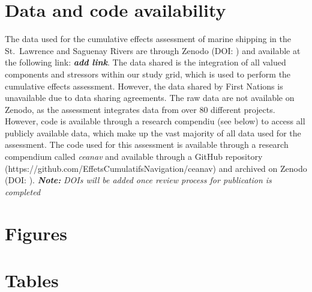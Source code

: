 \documentclass[preprint, 3p,
authoryear]{elsarticle} %
\begin{document}
\hypertarget{data-and-code-availability}{%
\section*{Data and code availability}\label{data-and-code-availability}}

The data used for the cumulative effects assessment of marine shipping
in the St.~Lawrence and Saguenay Rivers are through Zenodo (DOI: ) and
available at the following link: \textbf{\emph{add link}}. The data
shared is the integration of all valued components and stressors within
our study grid, which is used to perform the cumulative effects
assessment. However, the data shared by First Nations is unavailable due
to data sharing agreements. The raw data are not available on Zenodo, as
the assessment integrates data from over 80 different projects. However,
code is available through a research compendiu (see below) to access all
publicly available data, which make up the vast majority of all data
used for the assessment. The code used for this assessment is available
through a research compendium called \emph{ceanav} and available through
a GitHub repository
(https://github.com/EffetsCumulatifsNavigation/ceanav) and archived on
Zenodo (DOI: ). \textbf{\emph{Note:}} \emph{DOIs will be added once
review process for publication is completed}

\newpage

\hypertarget{figures}{%
\section*{Figures}\label{figures}}

\hypertarget{tables}{%
\section*{Tables}\label{tables}}

\newpage

\renewcommand\refname{References}

\end{document}
